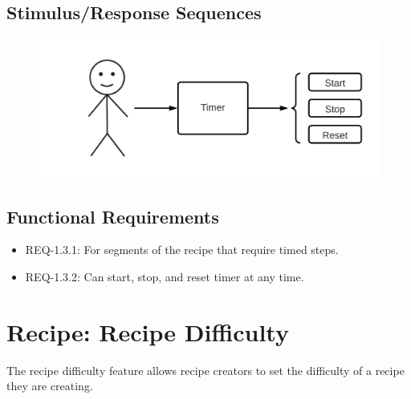 \documentclass{scrreprt}
\begin{document}
\subsection{Stimulus/Response Sequences}

\begin{figure}[H]\centering
    \includegraphics[width=\columnwidth]{FlowCharts/Recipe-Timer.png}
\end{figure}

\subsection{\gls{Functional Requirements}}

\begin{itemize}
    \item REQ-1.3.1: For segments of the recipe that require timed steps.
    \item REQ-1.3.2: Can start, stop, and reset timer at any time.
\end{itemize}

\section{Recipe: Recipe Difficulty}

The recipe difficulty feature allows recipe creators to set the difficulty of a recipe they are creating.
\end{document}
